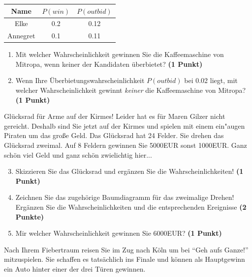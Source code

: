 \documentclass[a4paper, 10pt]{scrartcl}\usepackage[]{graphicx}\usepackage[]{xcolor}
\begin{document}
\begin{center}
\begin{tabular}{ccc}
  \toprule
  Name & $P(win)$ & $P(outbid)$\\
  \midrule
  Elke & 0.2 & 0.12\\
  Annegret & 0.1 & 0.11 \\
  \bottomrule
\end{tabular}
\end{center}

\begin{enumerate}
\item Mit welcher Wahrscheinlichkeit gewinnen Sie die Kaffeemaschine von
  Mitropa, wenn keiner der Kandidaten {\"u}berbietet? \textbf{(1 Punkt)}
\item Wenn Ihre {\"U}berbietungswahrscheinlichkeit $P(outbid)$ bei
  0.02 liegt, mit welcher Wahrscheinlichkeit gewinnt
  \textit{keiner} die Kaffeemaschine von Mitropa? \textbf{(1 Punkt)}
\end{enumerate}

Gl{\"u}cksrad f{\"u}r Arme auf der Kirmes! Leider hat es f{\"u}r Maren Gilzer nicht
gereicht. Deshalb sind Sie jetzt auf der Kirmes und spielen mit
einem ein{"a}ugen Piraten um das gro{\ss}e Geld. Das Gl{\"u}cksrad hat 24
Felder. Sie drehen das Gl{\"u}cksrad zweimal. Auf 8 Feldern
gewinnen Sie 5000EUR sonst 1000EUR. Ganz sch{\"o}n viel Geld
und ganz sch{\"o}n zwielichtig hier...

\begin{enumerate}
  \setcounter{enumi}{2}  
\item Skizzieren Sie das Gl{\"u}cksrad und erg{\"a}nzen Sie die
  Wahrscheinlichkeiten! \textbf{(1 Punkt)}
\item Zeichnen Sie das zugeh{\"o}rige Baumdiagramm f{\"u}r das zweimalige Drehen!
  Erg{\"a}nzen Sie die Wahrscheinlichkeiten und die entsprechenden Ereignisse
  \textbf{(2 Punkte)}
\item Mir welcher Wahrscheinlichkeit gewinnen Sie 6000EUR? \textbf{(1
    Punkt)}
\end{enumerate}

Nach Ihrem Fiebertraum reisen Sie im Zug nach K{\"o}ln um bei "`Geh aufs
Ganze!"' mitzuspielen. Sie schaffen es tats{\"a}chlich ins Finale und k{\"o}nnen
als Hauptgewinn ein Auto hinter einer der drei T{\"u}ren gewinnen. 
\end{document}
